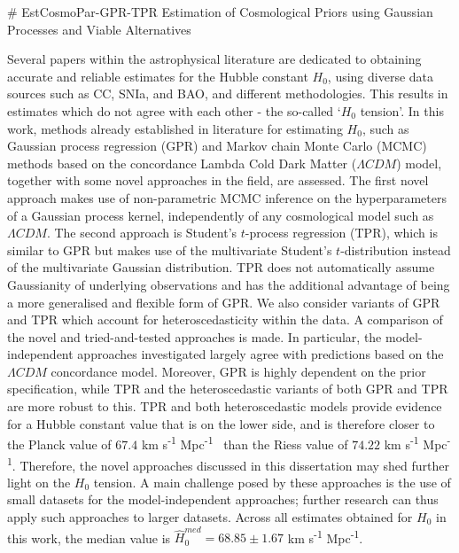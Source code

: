 # EstCosmoPar-GPR-TPR
Estimation of Cosmological Priors using Gaussian Processes and Viable Alternatives

Several papers within the astrophysical literature are dedicated to obtaining accurate and reliable estimates for the Hubble constant $H_0$, using diverse data sources such as CC, SNIa, and BAO, and different methodologies. This results in estimates which do not agree with each other - the so-called `$H_0$ tension'. In this work, methods already established in literature for estimating $H_0$, such as Gaussian process regression (GPR) and Markov chain Monte Carlo (MCMC) methods based on the concordance Lambda Cold Dark Matter ($\Lambda CDM$) model, together with some novel approaches in the field, are assessed. The first novel approach makes use of non-parametric MCMC inference on the hyperparameters of a Gaussian process kernel, independently of any cosmological model such as $\Lambda CDM$. The second approach is Student's $t$-process regression (TPR), which is similar to GPR but makes use of the multivariate Student's $t$-distribution instead of the multivariate Gaussian distribution. TPR does not automatically assume Gaussianity of underlying observations and has the additional advantage of being a more generalised and flexible form of GPR. We also consider variants of GPR and TPR which account for heteroscedasticity within the data. A comparison of the novel and tried-and-tested approaches is made. In particular, the model-independent approaches investigated largely agree with predictions based on the $\Lambda CDM$ concordance model. Moreover, GPR is highly dependent on the prior specification, while TPR and the heteroscedastic variants of both GPR and TPR are more robust to this. TPR and both heteroscedastic models provide evidence for a Hubble constant value that is on the lower side, and is therefore closer to the Planck value of $67.4$ km s\textsuperscript{-1} Mpc\textsuperscript{-1} \ than the Riess value of $74.22$ km s\textsuperscript{-1} Mpc\textsuperscript{-1}. Therefore, the novel approaches discussed in this dissertation may shed further light on the $H_0$ tension. A main challenge posed by these approaches is the use of small datasets for the model-independent approaches; further research can thus apply such approaches to larger datasets. Across all estimates obtained for $H_0$ in this work, the median value is $\hat{H}_0^{med} = 68.85 \pm 1.67$ km s\textsuperscript{-1} Mpc\textsuperscript{-1}.
